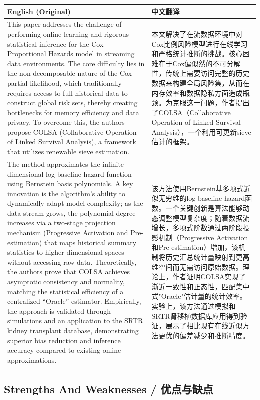 \documentclass[10pt,a4paper]{article}
\begin{document}
\begin{longtable}{L{0.48\textwidth}|L{0.48\textwidth}}
\hline
\textbf{English (Original)} & \textbf{中文翻译} \\
\hline
This paper addresses the challenge of performing online learning and rigorous statistical inference for the Cox Proportional Hazards model in streaming data environments. The core difficulty lies in the non-decomposable nature of the Cox partial likelihood, which traditionally requires access to full historical data to construct global risk sets, thereby creating bottlenecks for memory efficiency and data privacy. To overcome this, the authors propose COLSA (Collaborative Operation of Linked Survival Analysis), a framework that utilizes renewable sieve estimation.
&
本文解决了在流数据环境中对Cox比例风险模型进行在线学习和严格统计推断的挑战。核心困难在于Cox偏似然的不可分解性，传统上需要访问完整的历史数据来构建全局风险集，从而在内存效率和数据隐私方面造成瓶颈。为克服这一问题，作者提出了COLSA（Collaborative Operation of Linked Survival Analysis），一个利用可更新sieve估计的框架。 \\
\hline
The method approximates the infinite-dimensional log-baseline hazard function using Bernstein basis polynomials. A key innovation is the algorithm's ability to dynamically adapt model complexity; as the data stream grows, the polynomial degree increases via a two-stage projection mechanism (Progressive Activation and Pre-estimation) that maps historical summary statistics to higher-dimensional spaces without accessing raw data. Theoretically, the authors prove that COLSA achieves asymptotic consistency and normality, matching the statistical efficiency of a centralized ``Oracle'' estimator. Empirically, the approach is validated through simulations and an application to the SRTR kidney transplant database, demonstrating superior bias reduction and inference accuracy compared to existing online approximations.
&
该方法使用Bernstein基多项式近似无穷维的log-baseline hazard函数。一个关键创新是算法能够动态调整模型复杂度；随着数据流增长，多项式阶数通过两阶段投影机制（Progressive Activation和Pre-estimation）增加，该机制将历史汇总统计量映射到更高维空间而无需访问原始数据。理论上，作者证明COLSA实现了渐近一致性和正态性，匹配集中式"Oracle"估计量的统计效率。实验上，该方法通过模拟和SRTR肾移植数据库应用得到验证，展示了相比现有在线近似方法更优的偏差减少和推断精度。 \\
\hline
\end{longtable}

\subsection{Strengths And Weaknesses / 优点与缺点}
\end{document}
